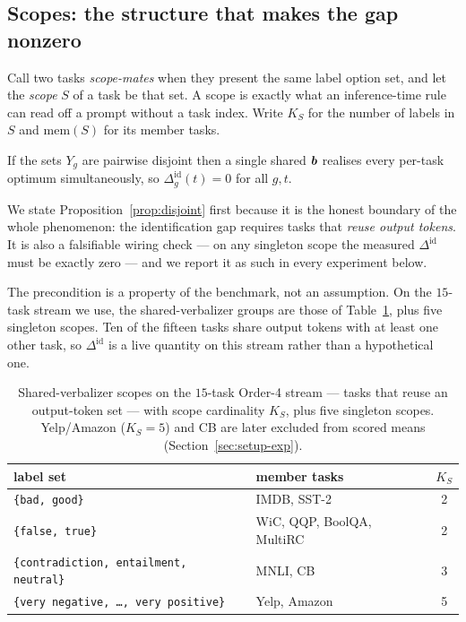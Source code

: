 \subsection{Scopes: the structure that makes the gap nonzero}

Call two tasks \emph{scope-mates} when they present the same label option set,
and let the \emph{scope} $S$ of a task be that set. A scope is exactly what an
inference-time rule can read off a prompt without a task index. Write $K_S$ for
the number of labels in $S$ and $\mathrm{mem}(S)$ for its member tasks.

\begin{proposition}
\label{prop:disjoint}
If the sets $Y_g$ are pairwise disjoint then a single shared $\bm{b}$ realises every
per-task optimum simultaneously, so $\Delta_g^{\mathrm{id}}(t)=0$ for all $g,t$.
\end{proposition}

\noindent We state Proposition~\ref{prop:disjoint} first because it is the honest
boundary of the whole phenomenon: the identification gap requires tasks that
\emph{reuse output tokens}. It is also a falsifiable wiring check --- on any
singleton scope the measured $\Delta^{\mathrm{id}}$ must be exactly zero --- and we
report it as such in every experiment below.

The precondition is a property of the benchmark, not an assumption. On the
$15$-task stream we use, the shared-verbalizer groups are those of
Table~\ref{tab:scope-structure}, plus five singleton scopes. Ten of the fifteen
tasks share output tokens with at least one other task, so $\Delta^{\mathrm{id}}$ is
a live quantity on this stream rather than a hypothetical one.

\begin{table}[t]
\centering
\small
\caption{Shared-verbalizer scopes on the $15$-task Order-4 stream --- tasks that
reuse an output-token set --- with scope cardinality $K_S$, plus five singleton
scopes. Yelp/Amazon ($K_S=5$) and CB are later excluded from scored means
(Section~\ref{sec:setup-exp}).}
\label{tab:scope-structure}
\begin{tabular}{llc}
\toprule
label set & member tasks & $K_S$ \\
\midrule
\texttt{\{bad, good\}}                 & IMDB, SST-2 & 2 \\
\texttt{\{false, true\}}               & WiC, QQP, BoolQA, MultiRC & 2 \\
\texttt{\{contradiction, entailment, neutral\}} & MNLI, CB & 3 \\
\texttt{\{very negative, \ldots, very positive\}} & Yelp, Amazon & 5 \\
\bottomrule
\end{tabular}
\end{table}

